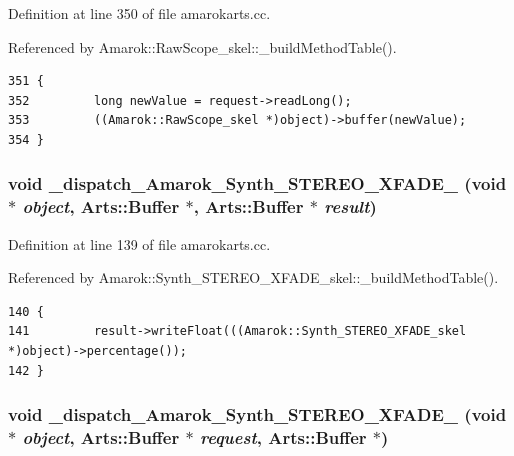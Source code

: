 Definition at line 350 of file amarokarts.cc.

Referenced by Amarok::Raw\-Scope\_\-skel::\_\-build\-Method\-Table().



\footnotesize\begin{verbatim}351 {
352         long newValue = request->readLong();
353         ((Amarok::RawScope_skel *)object)->buffer(newValue);
354 }
\end{verbatim}\normalsize 
{}
\subsubsection{\setlength{\rightskip}{0pt plus 5cm}void \_\-dispatch\_\-Amarok\_\-Synth\_\-STEREO\_\-XFADE\_ (void $\ast$ {\em object}, Arts::Buffer $\ast$, Arts::Buffer $\ast$ {\em result})\hspace{0.3cm}{\tt  [static]}}\label{amarokarts_8cc_a0}




Definition at line 139 of file amarokarts.cc.

Referenced by Amarok::Synth\_\-STEREO\_\-XFADE\_\-skel::\_\-build\-Method\-Table().



\footnotesize\begin{verbatim}140 {
141         result->writeFloat(((Amarok::Synth_STEREO_XFADE_skel *)object)->percentage());
142 }
\end{verbatim}\normalsize 
{}
\subsubsection{\setlength{\rightskip}{0pt plus 5cm}void \_\-dispatch\_\-Amarok\_\-Synth\_\-STEREO\_\-XFADE\_ (void $\ast$ {\em object}, Arts::Buffer $\ast$ {\em request}, Arts::Buffer $\ast$)\hspace{0.3cm}{\tt  [static]}}\label{amarokarts_8cc_a1}




